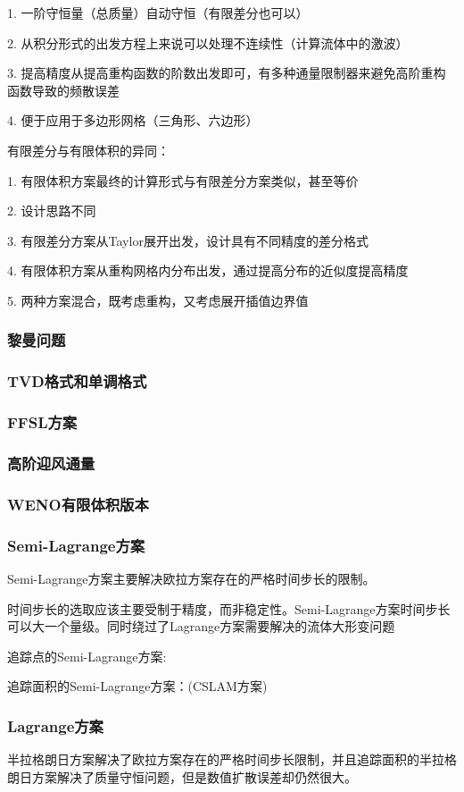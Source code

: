 \documentclass{article}
\begin{document}
1. 一阶守恒量（总质量）自动守恒（有限差分也可以）

2. 从积分形式的出发方程上来说可以处理不连续性（计算流体中的激波）

3. 提高精度从提高重构函数的阶数出发即可，有多种通量限制器来避免高阶重构函数导致的频散误差

4. 便于应用于多边形网格（三角形、六边形）

有限差分与有限体积的异同：

1. 有限体积方案最终的计算形式与有限差分方案类似，甚至等价

2. 设计思路不同

3. 有限差分方案从Taylor展开出发，设计具有不同精度的差分格式

4. 有限体积方案从重构网格内分布出发，通过提高分布的近似度提高精度

5. 两种方案混合，既考虑重构，又考虑展开插值边界值


\subsubsection{黎曼问题}
\subsubsection{TVD格式和单调格式}
\subsubsection{FFSL方案}
\subsubsection{高阶迎风通量}
\subsubsection{WENO有限体积版本}
\subsubsection{Semi-Lagrange方案}
Semi-Lagrange方案主要解决欧拉方案存在的严格时间步长的限制。

时间步长的选取应该主要受制于精度，而非稳定性。Semi-Lagrange方案时间步长可以大一个量级。同时绕过了Lagrange方案需要解决的流体大形变问题

追踪点的Semi-Lagrange方案:

追踪面积的Semi-Lagrange方案：(CSLAM方案)

\subsubsection{Lagrange方案}
半拉格朗日方案解决了欧拉方案存在的严格时间步长限制，并且追踪面积的半拉格朗日方案解决了质量守恒问题，但是数值扩散误差却仍然很大。
\end{document}
